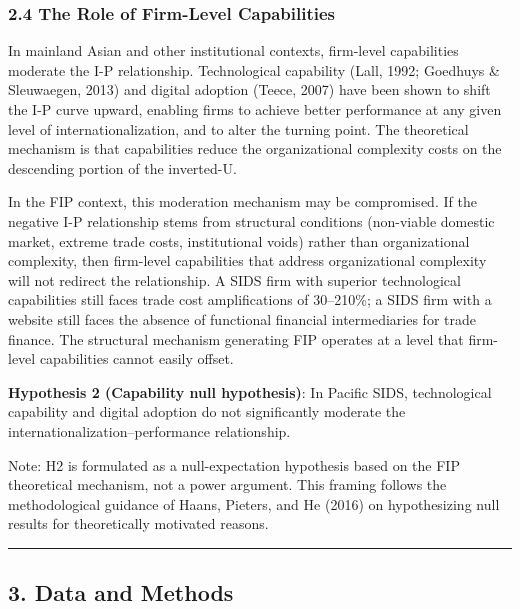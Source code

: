 \documentclass[12pt,a4paper]{article}
\begin{document}
\hypertarget{24-the-role-of-firm-level-capabilities}{%
\subsubsection{2.4 The Role of Firm-Level
Capabilities}\label{24-the-role-of-firm-level-capabilities}}

In mainland Asian and other institutional contexts, firm-level
capabilities moderate the I-P relationship. Technological capability
(Lall, 1992; Goedhuys \& Sleuwaegen, 2013) and digital adoption (Teece,
2007) have been shown to shift the I-P curve upward, enabling firms to
achieve better performance at any given level of internationalization,
and to alter the turning point. The theoretical mechanism is that
capabilities reduce the organizational complexity costs on the
descending portion of the inverted-U.

In the FIP context, this moderation mechanism may be compromised. If the
negative I-P relationship stems from structural conditions (non-viable
domestic market, extreme trade costs, institutional voids) rather than
organizational complexity, then firm-level capabilities that address
organizational complexity will not redirect the relationship. A SIDS
firm with superior technological capabilities still faces trade cost
amplifications of 30--210\%; a SIDS firm with a website still faces the
absence of functional financial intermediaries for trade finance. The
structural mechanism generating FIP operates at a level that firm-level
capabilities cannot easily offset.

\textbf{Hypothesis 2 (Capability null hypothesis)}: In Pacific SIDS,
technological capability and digital adoption do not significantly
moderate the internationalization--performance relationship.

Note: H2 is formulated as a null-expectation hypothesis based on the FIP
theoretical mechanism, not a power argument. This framing follows the
methodological guidance of Haans, Pieters, and He (2016) on
hypothesizing null results for theoretically motivated reasons.

\begin{center}\rule{0.5\linewidth}{0.5pt}\end{center}

\hypertarget{3-data-and-methods}{%
\subsection{3. Data and Methods}\label{3-data-and-methods}}
\end{document}
